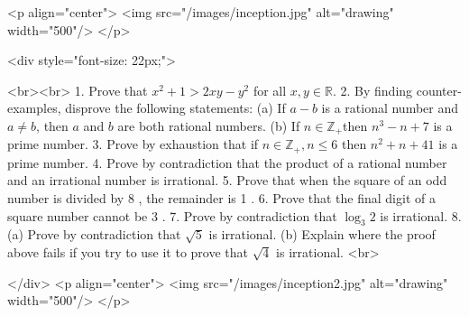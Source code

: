 <p align="center">
<img src="/images/inception.jpg" alt="drawing" width="500"/>
</p>

<div style="font-size: 22px;">

<br><br>
1. Prove that $x^{2}+1>2 x y-y^{2}$ for all $x, y \in \mathbb{R}$.
2. By finding counter-examples, disprove the following statements:
(a) If $a-b$ is a rational number and $a \neq b$, then $a$ and $b$ are both rational numbers.
(b) If $n \in \mathbb{Z}_{+}$then $n^{3}-n+7$ is a prime number.
3. Prove by exhaustion that if $n \in \mathbb{Z}_{+}, n \leq 6$ then $n^{2}+n+41$ is a prime number.
4. Prove by contradiction that the product of a rational number and an irrational number is irrational.
5. Prove that when the square of an odd number is divided by 8 , the remainder is 1 .
6. Prove that the final digit of a square number cannot be 3 .
7. Prove by contradiction that $\log _{3} 2$ is irrational.
8. (a) Prove by contradiction that $\sqrt{5}$ is irrational.
(b) Explain where the proof above fails if you try to use it to prove that $\sqrt{4}$ is irrational.
<br>

</div>
<p align="center">
<img src="/images/inception2.jpg" alt="drawing" width="500"/>
</p>
